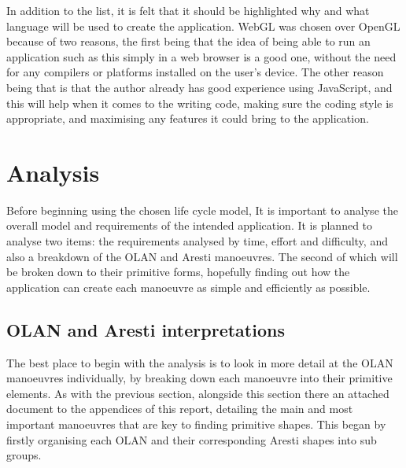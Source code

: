 In addition to the list, it is felt that it should be highlighted why and what language will be used to create the application. WebGL was chosen over OpenGL because of two reasons, the first being that the idea of being able to run an application such as this simply in a web browser is a good one, without the need for any compilers or platforms installed on the user's device. The other reason being that is that the author already has good experience using JavaScript, and this will help when it comes to the writing code, making sure the coding style is appropriate, and maximising any features it could bring to the application.

\section{Analysis}
Before beginning using the chosen life cycle model, It is important to analyse the overall model and requirements of the intended application. It is planned to analyse two items: the requirements analysed by time, effort and difficulty, and also a breakdown of the OLAN and Aresti manoeuvres. The second of which will be broken down to their primitive forms, hopefully finding out how the application can create each manoeuvre as simple and efficiently as possible.

\subsection{OLAN and Aresti interpretations}
The best place to begin with the analysis is to look in more detail at the OLAN manoeuvres individually, by breaking down each manoeuvre into their primitive elements. As with the previous section, alongside this section there an attached document to the appendices of this report, detailing the main and most important manoeuvres that are key to finding primitive shapes. This began by firstly organising each OLAN and their corresponding Aresti shapes into sub groups. 

